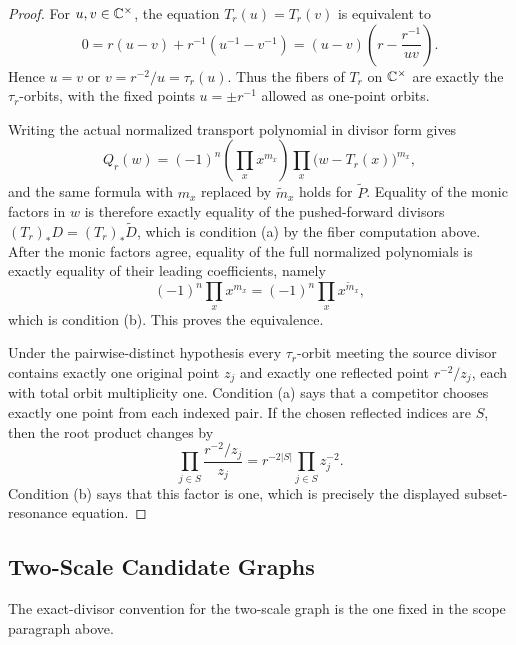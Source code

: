 \begin{proof}
For \(u,v\in\mathbb{C}^\times\), the equation \(T_r(u)=T_r(v)\) is equivalent to
\[
0=r(u-v)+r^{-1}(u^{-1}-v^{-1})=(u-v)\left(r-\frac{r^{-1}}{uv}\right).
\]
Hence \(u=v\) or \(v=r^{-2}/u=\tau_r(u)\).  Thus the fibers of \(T_r\) on \(\mathbb{C}^\times\) are exactly the \(\tau_r\)-orbits, with the fixed points \(u=\pm r^{-1}\) allowed as one-point orbits.

Writing the actual normalized transport polynomial in divisor form gives
\[
Q_r(w)=(-1)^n\left(\prod_x x^{m_x}\right)
\prod_x\bigl(w-T_r(x)\bigr)^{m_x},
\]
and the same formula with \(m_x\) replaced by \(\widetilde m_x\) holds for \(\widetilde P\).  Equality of the monic factors in \(w\) is therefore exactly equality of the pushed-forward divisors \((T_r)_\ast D=(T_r)_\ast\widetilde D\), which is condition \textup{(a)} by the fiber computation above.  After the monic factors agree, equality of the full normalized polynomials is exactly equality of their leading coefficients, namely
\[
(-1)^n\prod_xx^{m_x}=(-1)^n\prod_xx^{\widetilde m_x},
\]
which is condition \textup{(b)}.  This proves the equivalence.

Under the pairwise-distinct hypothesis every \(\tau_r\)-orbit meeting the source divisor contains exactly one original point \(z_j\) and exactly one reflected point \(r^{-2}/z_j\), each with total orbit multiplicity one.  Condition \textup{(a)} says that a competitor chooses exactly one point from each indexed pair.  If the chosen reflected indices are \(S\), then the root product changes by
\[
\prod_{j\in S}\frac{r^{-2}/z_j}{z_j}
=r^{-2|S|}\prod_{j\in S}z_j^{-2}.
\]
Condition \textup{(b)} says that this factor is one, which is precisely the displayed subset-resonance equation.
\end{proof}


\subsection{Two-Scale Candidate Graphs}\label{subsec:two-scale-candidate-graphs}

The exact-divisor convention for the two-scale graph is the one fixed in
the scope paragraph above.

